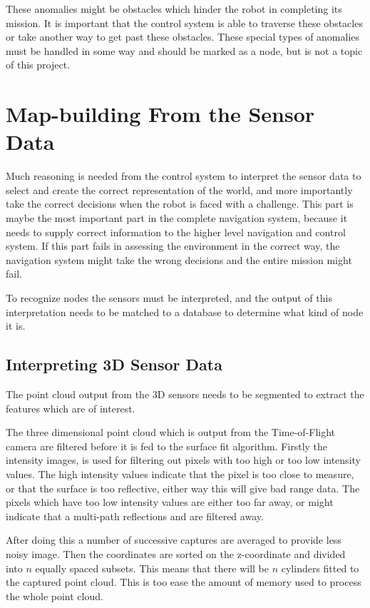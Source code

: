 These anomalies might be obstacles which hinder the robot in completing its mission. It is
important that the control system is able to traverse these obstacles or take another way
to get past these obstacles. These special types of anomalies must be handled in some way
and should be marked as a node, but is not a topic of this project. 

\section{Map-building From the Sensor Data}
Much reasoning is needed from the control system to interpret the sensor data to select
and create the correct representation of the world, and more importantly take the correct
decisions when the robot is faced with a challenge. This part is maybe the most important
part in the complete navigation system, because it needs to supply correct information to
the higher level navigation and control system. If this part fails in assessing the
environment in the correct way, the navigation system might take the wrong decisions and
the entire mission might fail. 

To recognize nodes the sensors must be interpreted, and the output of this interpretation
needs to be matched to a database to determine what kind of node it is. 

\subsection{Interpreting 3D Sensor Data}
The point cloud output from the 3D sensors needs to be segmented to extract the features
which are of interest. 

The three dimensional point cloud which is output from the Time-of-Flight camera are
filtered before it is fed to the surface fit algorithm. Firstly the intensity images, is
used for filtering out pixels with too high or too low intensity values. The high
intensity values indicate that the pixel is too close to measure, or that the surface is
too reflective, either way this will give bad range data. The pixels which have too low
intensity values are either too far away, or might indicate that a multi-path reflections
and are filtered away. 

After doing this a number of successive captures are averaged to provide less noisy image.
Then the coordinates are sorted on the z-coordinate and divided into $n$ equally spaced
subsets. This means that there will be $n$ cylinders fitted to the captured point cloud.
This is too ease the amount of memory used to process the whole point cloud. 

